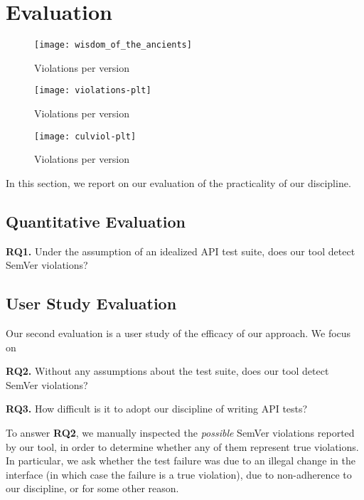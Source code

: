\section{Evaluation}

\begin{figure}
\centering
\texttt{[image: wisdom\_of\_the\_ancients]}
\caption{Violations per version}
\end{figure}

\begin{figure*}
\centering
\texttt{[image: violations-plt]}
\caption{Violations per version}
\end{figure*}

\begin{figure*}
\centering
\texttt{[image: culviol-plt]}
\caption{Violations per version}
\end{figure*}



In this section, we report on our evaluation of the practicality of
our discipline. 

\subsection{Quantitative Evaluation}

{\bf RQ1.} Under the assumption of an idealized API test suite, does
our tool detect SemVer violations?

\subsection{User Study Evaluation}
Our second evaluation is a user study of the efficacy of our
approach. We focus on 

{\bf RQ2.} Without any assumptions about the test suite, does our tool
detect SemVer violations?

{\bf RQ3.} How difficult is it to adopt our discipline of writing API
tests?

To answer {\bf RQ2}, we manually inspected the {\em possible\/} SemVer
violations reported by our tool, in order to determine whether any of
them represent true violations. In particular, we ask whether the test
failure was due to an illegal change in the interface (in which case
the failure is a true violation), due to non-adherence to our
discipline, or for some other reason.

